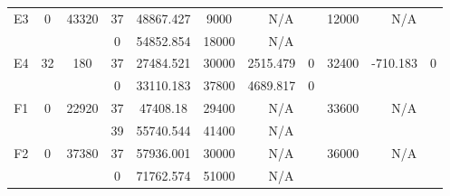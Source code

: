 \begin{sidewaystable}
\begin{tabular}{c||c|c||c|c|c|c|c||c|c|c}
         &
        
      \\
      \hline
      \multirow{2}{*}{E3} &
      \multirow{2}{*}{0} &
      \multirow{2}{*}{43320} &
      37 &
      48867.427 &
      9000 &
        \multicolumn{2}{|c||}{N/A} &
      \multirow{2}{*}{12000} &
        \multicolumn{2}{c}{\multirow{2}{*}{N/A}}
      \\
      \cline{4-8}
       &
       &
       &
      0 &
      54852.854 &
      18000 &
        \multicolumn{2}{|c||}{N/A} &
      
        
      \\
      \hline
      \multirow{2}{*}{E4} &
      \multirow{2}{*}{32} &
      \multirow{2}{*}{180} &
      37 &
      27484.521 &
      30000 &
        2515.479 &
        0 &
      \multirow{2}{*}{32400} &
        \multirow{2}{*}{-710.183} &
        \multirow{2}{*}{0}
      \\
      \cline{4-8}
       &
       &
       &
      0 &
      33110.183 &
      37800 &
        4689.817 &
        0 &
      
         &
        
      \\
      \hline
      \multirow{2}{*}{F1} &
      \multirow{2}{*}{0} &
      \multirow{2}{*}{22920} &
      37 &
      47408.18 &
      29400 &
        \multicolumn{2}{|c||}{N/A} &
      \multirow{2}{*}{33600} &
        \multicolumn{2}{c}{\multirow{2}{*}{N/A}}
      \\
      \cline{4-8}
       &
       &
       &
      39 &
      55740.544 &
      41400 &
        \multicolumn{2}{|c||}{N/A} &
      
        
      \\
      \hline
      \multirow{2}{*}{F2} &
      \multirow{2}{*}{0} &
      \multirow{2}{*}{37380} &
      37 &
      57936.001 &
      30000 &
        \multicolumn{2}{|c||}{N/A} &
      \multirow{2}{*}{36000} &
        \multicolumn{2}{c}{\multirow{2}{*}{N/A}}
      \\
      \cline{4-8}
       &
       &
       &
      0 &
      71762.574 &
      51000 &
        \multicolumn{2}{|c||}{N/A} &
      
        
      \\
\end{tabular}
\label{table:RDS2.txt-8948.tex} 
\end{sidewaystable}
